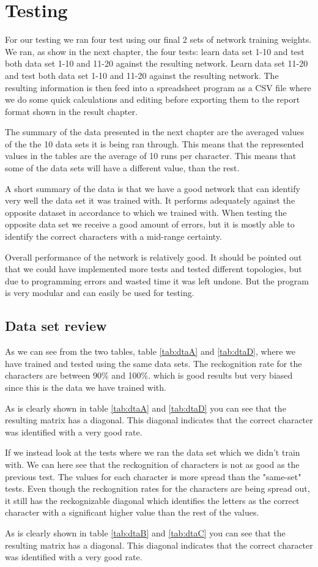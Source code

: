 \section{Testing}
For our testing we ran four test using our final 2 sets of network training
weights.  We ran, as show in the next chapter, the four tests: learn data set
1-10 and test both data set 1-10 and 11-20 against the resulting network. Learn
data set 11-20 and test both data set 1-10 and 11-20 against the resulting
network.  The resulting information is then feed into a spreadsheet program as a
CSV file where we do some quick calculations and editing before exporting them
to the report format shown in the result chapter.

The summary of the data presented in the next chapter are the averaged values of
the the 10 data sets it is being ran through.  This means that the represented
values in the tables are the average of 10 runs per character.  This means that
some of the data sets will have a different value, than the rest.

A short summary of the data is that we have a good network that can identify
very well the data set it was trained with. It performs adequately against the
opposite dataset in accordance to which we trained with. When testing the
opposite data set we receive a good amount of errors, but it is mostly able to
identify the correct characters with a mid-range certainty.

Overall performance of the network is relatively good. It should be pointed out
that we could have implemented more tests and tested different topologies, but
due to programming errors and wasted time it was left undone. But the program is
very modular and can easily be used for testing.

\subsection{Data set review}
As we can see from the two tables, table \ref{tab:dtaA} and \ref{tab:dtaD}, 
where we have trained and tested using the same data sets. The reckognition rate
for the characters are between 90\% and 100\%. which is good results but very
biased since this is the data we have trained with.

As is clearly shown in table \ref{tab:dtaA} and \ref{tab:dtaD} you can see that
the resulting matrix has a diagonal. This diagonal indicates that the correct
character was identified with a very good rate.

If we instead look at the tests where we ran the data set which we didn't
train with. We can here see that the reckognition of characters is not as good
as the previous test.  The values for each character is more spread than the
"same-set" tests.  Even though the reckognition rates for the characters are
being spread out, it still has the reckognizable diagonal which identifies the
letters as the correct character with a significant higher value than the rest
of the values.

As is clearly shown in table \ref{tab:dtaB} and \ref{tab:dtaC} you can see that
the resulting matrix has a diagonal. This diagonal indicates that the correct
character was identified with a very good rate.


